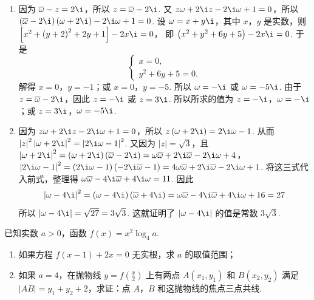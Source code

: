\documentclass[UTF8,a4paper,oneside,11pt]{ctexbook}
\begin{document}
\begin{solution}
\begin{enumerate}
\item 因为 \(\overline{\omega}-z=2\i\)，所以 \(z=\overline{\omega}-2\i\). 又 \(z\omega+2\i z-2\i\omega+1=0\)，所以
\(\left( \overline{\omega}-2\i \right)\left( \omega+2\i \right)-2\i\omega+1=0\).
设 \(\omega=x+y\i\)，其中 \(x\)，\(y\) 是实数，则
\(\left[ x^2+\left( y+2 \right)^2+2y+1 \right]-2x\i=0\)，
即
\(\left( x^2+y^2+6y+5 \right)-2x\i=0\).
于是
\[
\begin{cases}
x=0,\\
y^2+6y+5=0.
\end{cases}
\]
解得 \(x=0\)，\(y=-1\)；或 \(x=0\)，\(y=-5\). 所以 \(\omega=-\i\) 或 \(\omega=-5\i\). 由于 \(z=\overline{\omega}-2\i\)，因此 \(z=-\i\) 或 \(z=3\i\). 所以所求的值为 \(z=-\i\)，\(\omega=-\i\)；或 \(z=3\i\)，\(\omega=-5\i\).

\item 因为 \(z\omega+2\i z-2\i\omega+1=0\)，所以
\(z\left( \omega+2\i \right)=2\i\omega-1\).
从而
\(\left| z \right|^2\left| \omega+2\i \right|^2=\left| 2\i\omega-1 \right|^2\).
又因为 \(\left| z \right|=\sqrt{3}\)，且
\(\left| \omega+2\i \right|^2=\left( \omega+2\i \right)\left( \overline{\omega}-2\i \right)=\omega\overline{\omega}+2\i\overline{\omega}-2\i\omega+4\)，
\(\left| 2\i\omega-1 \right|^2=\left( 2\i\omega-1 \right)\left( -2\i\overline{\omega}-1 \right)=4\omega\overline{\omega}+2\i\overline{\omega}-2\i\omega+1\).
将这三式代入前式，整理得
\(\omega\overline{\omega}-4\i\overline{\omega}+4\i\omega=11\).
因此
\[
\left| \omega-4\i \right|^2=\left( \omega-4\i \right)\left( \overline{\omega}+4\i \right)=\omega\overline{\omega}-4\i\overline{\omega}+4\i\omega+16=27
\]
所以
\(\left| \omega-4\i \right|=\sqrt{27}=3\sqrt{3}\).
这就证明了 \(\left| \omega-4\i \right|\) 的值是常数 \(3\sqrt{3}\).
\end{enumerate}
\end{solution}

\begin{problem}
已知实数 \(a>0\)，函数 \(f(x)=x^2\log_4 a\).

\begin{enumerate}
\item 如果方程 \(f(x-1)+2x=0\) 无实根，求 \(a\) 的取值范围；
\item 如果 \(a=4\)，在抛物线 \(y=f\left( \frac{x}{2} \right)\) 上有两点 \(A(x_1,y_1)\) 和 \(B(x_2,y_2)\) 满足 \(\left| AB \right|=y_1+y_2+2\)，求证：点 \(A\)，\(B\) 和这抛物线的焦点三点共线.
\end{enumerate}
\end{problem}
\end{document}
